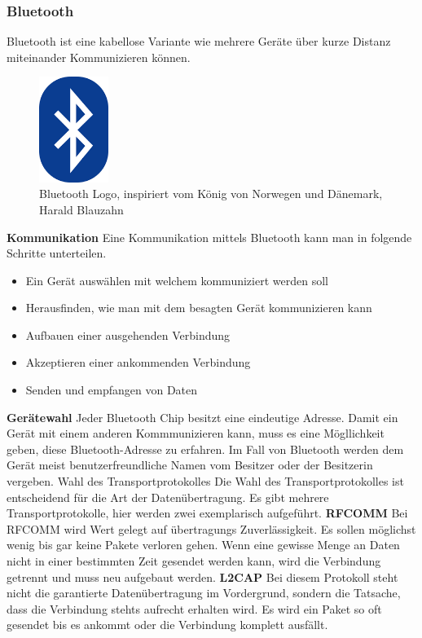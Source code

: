 \subsubsection{Bluetooth}
\label{subsec:Bluetooth}
Bluetooth ist eine kabellose Variante wie mehrere Geräte über kurze Distanz miteinander Kommunizieren können.

\begin{figure}
  \begin{center}
    \includegraphics[width=0.2\textwidth]{images/bluetooth}
  \end{center}
  \caption{Bluetooth Logo, inspiriert vom König von Norwegen und Dänemark, Harald Blauzahn \cite{PERT.CH2-bluetooth.logo}}\label{Fig:imgBluetoothLogo}
\end{figure}

\textbf{Kommunikation\newline}
Eine Kommunikation mittels Bluetooth kann man in folgende Schritte unterteilen.
\nextline
\begin{itemize}
\item Ein Gerät auswählen mit welchem kommuniziert werden soll
\item Herausfinden, wie man mit dem besagten Gerät kommunizieren kann
\item Aufbauen einer ausgehenden Verbindung
\item Akzeptieren einer ankommenden Verbindung
\item Senden und empfangen von Daten
\end{itemize}
\textbf{Gerätewahl\nextline}
Jeder Bluetooth Chip besitzt eine eindeutige Adresse. Damit ein Gerät mit einem anderen Kommmunizieren kann, muss es eine Mögllichkeit geben, diese Bluetooth-Adresse zu erfahren. Im Fall von Bluetooth werden dem Gerät meist benutzerfreundliche Namen vom Besitzer oder der Besitzerin vergeben.
Wahl des Transportprotokolles
Die Wahl des Transportprotokolles ist entscheidend für die Art der Datenübertragung. Es gibt mehrere Transportprotokolle, hier werden zwei exemplarisch aufgeführt.
\nextline
\textbf{RFCOMM\nextline}
Bei RFCOMM wird Wert gelegt auf übertragungs Zuverlässigkeit. Es sollen möglichst wenig bis gar keine Pakete verloren gehen. Wenn eine gewisse Menge an Daten nicht in einer bestimmten Zeit gesendet werden kann, wird die Verbindung getrennt und muss neu aufgebaut werden.
\nextline
\textbf{L2CAP\nextline}
Bei diesem Protokoll steht nicht die garantierte Datenübertragung im Vordergrund, sondern die Tatsache, dass die Verbindung stehts aufrecht erhalten wird. Es wird ein Paket so oft gesendet bis es ankommt oder die Verbindung komplett ausfällt.
\newpage